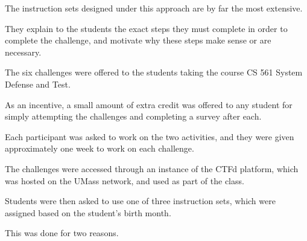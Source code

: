         The instruction sets designed under this approach are by far the most extensive. %







They explain to the students the exact steps they must complete in order to complete the challenge, and motivate why these steps make sense or are necessary. 






















    The six challenges were offered to the students taking the course CS 561 System Defense and Test. %







As an incentive, a small amount of extra credit was offered to any student for simply attempting the challenges and completing a survey after each. %







Each participant was asked to work on the two activities, and they were given approximately one week to work on each challenge. %







The challenges were accessed through an instance of the CTFd platform, which was hosted on the UMass network, and used as part of the class. %







Students were then asked to use one of three instruction sets, which were assigned based on the student's birth month. %







This was done for two reasons. %







